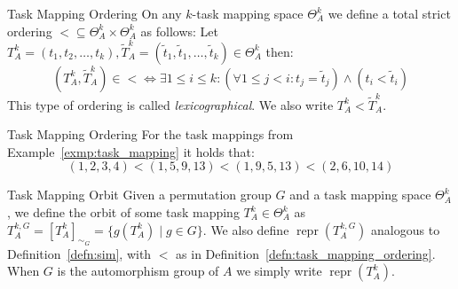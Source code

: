 \begin{defn}[label=defn:task_mapping_ordering]{Task Mapping Ordering}
  On any $k$-task mapping space $\Theta_A^k$ we define a total strict ordering
  $\operatorname{<} \subseteq \Theta_A^k \times \Theta_A^k$ as follows:
  Let $T_A^k = (t_1, t_2, \dots, t_k), \widetilde{T}_A^k = (\widetilde{t}_1,
  \widetilde{t}_1, \dots, \widetilde{t}_k) \in \Theta_A^k$ then:
  \begin{equation*}
    (T_A^k, \widetilde{T}_A^k) \in \operatorname{<}
      \Leftrightarrow
    \exists 1 \leq i \leq k:
      (\forall 1 \leq j < i: t_j = \widetilde{t}_j) \land (t_i < \widetilde{t}_i)
  \end{equation*}
  This type of ordering is called \textit{lexicographical}. We also write
  $T_A^k < \widetilde{T}_A^k$.
\end{defn}

\begin{exmp}{Task Mapping Ordering}
  For the task mappings from Example~\ref{exmp:task_mapping} it holds that:
  \begin{equation*}
    (1,2,3,4) < (1,5,9,13) < (1,9,5,13) < (2,6,10,14)
  \end{equation*}
\end{exmp}

\begin{defn}[label=exmp:task_mapping_orbit]{Task Mapping Orbit}
  Given a permutation group $G$ and a task mapping space $\Theta_A^k$, we
  define the orbit of some task mapping $T_A^k \in \Theta_A^k$ as $T_A^{k,G} =
  [T_A^k]_{\sim_G} = \{g(T_A^k) \mid g \in G\}$. We also define
  $\operatorname{repr}(T_A^{k,G})$ analogous to Definition~\ref{defn:sim}, with
  $<$ as in Definition~\ref{defn:task_mapping_ordering}. When $G$ is the
  automorphism group of $A$ we simply write $\operatorname{repr}(T_A^k)$.
\end{defn}

